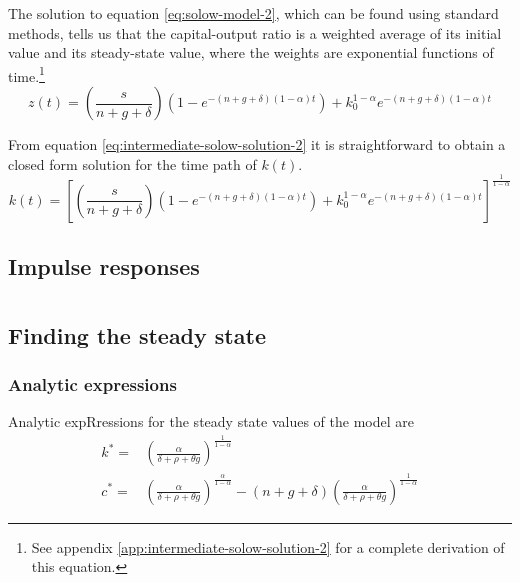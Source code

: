 \documentclass[11pt]{article}
\begin{document}
The solution to equation \ref{eq:solow-model-2}, which can be found using standard methods, tells us that the capital-output ratio is a weighted average of its initial value and its steady-state value, where the weights are exponential functions of time.\footnote{See appendix \ref{app:intermediate-solow-solution-2} for a complete derivation of this equation.}
\begin{equation}\label{eq:intermediate-solow-solution-2}
	z(t)= \left(\frac{s}{n+g+\delta}\right)\left(1 -  e^{-(n + g + \delta) (1-\alpha) t}\right) + k_0^{1-\alpha}e^{-(n + g + \delta) (1-\alpha) t}
\end{equation} 

From equation \ref{eq:intermediate-solow-solution-2} it is straightforward to obtain a closed form solution for the time path of $k(t)$.
\begin{equation}\label{eq:final-solow-solution}
	k(t) = \left[\left(\frac{s}{n+g+\delta}\right)\left(1 -  e^{-(n + g + \delta) (1-\alpha) t}\right) + k_0^{1-\alpha}e^{-(n + g + \delta) (1-\alpha) t}\right]^{\frac{1}{1-\alpha}}
\end{equation}


\subsection{Impulse responses}

\section{\cite{ramsey1928mathematical}}

\subsection{Finding the steady state}

\subsubsection{Analytic expressions}
Analytic expRressions for the steady state values of the \cite{ramsey1928mathematical} model are
\begin{align}
	k^* =& \left(\frac{\alpha}{\delta+\rho+\theta g}\right)^{\frac{1}{1-\alpha}} \\
	c^* =& \left(\frac{\alpha}{\delta+\rho+\theta g}\right)^{\frac{\alpha}{1-\alpha}} - (n+g+\delta)\left(\frac{\alpha}{\delta+\rho+\theta g}\right)^{\frac{1}{1-\alpha}}
\end{align}
\end{document}
